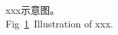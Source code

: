 \begin{figure}[!htb]
	\addtocounter{subfigure}{-1}
	\caption{xxx示意图。\\Fig~\ref{fig:ch2-f2}~Illustration of xxx.}
	\label{fig:ch2-f2}
\end{figure} 


